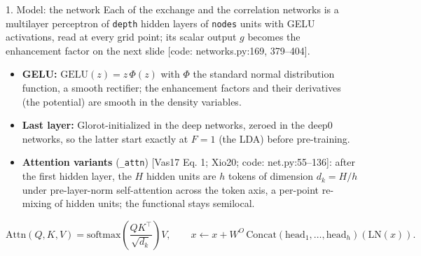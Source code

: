 \begin{frame}{1. Model: the network}
  \small
  Each of the exchange and the correlation networks is a multilayer perceptron of \texttt{depth} hidden layers of \texttt{nodes} units with GELU activations, read at every grid point; its scalar output $g$ becomes the enhancement factor on the next slide [code: networks.py:169, 379--404].
  \begin{itemize}
    \item \textbf{GELU:} $\mathrm{GELU}(z) = z\,\Phi(z)$ with $\Phi$ the standard normal distribution function, a smooth rectifier; the enhancement factors and their derivatives (the potential) are smooth in the density variables.
    \item \textbf{Last layer:} Glorot-initialized in the deep networks, zeroed in the deep0 networks, so the latter start exactly at $F = 1$ (the LDA) before pre-training.
    \item \textbf{Attention variants} (\texttt{\_attn}) [Vas17 Eq. 1; Xio20; code: net.py:55--136]: after the first hidden layer, the $H$ hidden units are $h$ tokens of dimension $d_k = H/h$ under pre-layer-norm self-attention across the token axis, a per-point re-mixing of hidden units; the functional stays semilocal.
  \end{itemize}
  \[
  \mathrm{Attn}(Q, K, V) = \mathrm{softmax}\!\left(\frac{QK^{\top}}{\sqrt{d_k}}\right) V, \qquad
  x \leftarrow x + W^{O}\,\mathrm{Concat}(\mathrm{head}_1, \ldots, \mathrm{head}_h)(\mathrm{LN}(x)).
  \]
\end{frame}
